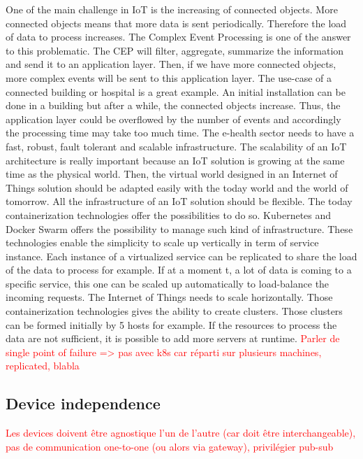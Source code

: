 \documentclass[11pt]{article}
\begin{document}
One of the main challenge in IoT is the increasing of connected objects. More connected objects means that more data is sent periodically. Therefore the load of data to process increases. The Complex Event Processing is one of the answer to this problematic. The CEP will filter, aggregate, summarize the information and send it to an application layer. Then, if we have more connected objects, more complex events will be sent to this application layer. The use-case of a connected building or hospital is a great example. An initial installation can be done in a building but after a while, the connected objects increase. Thus, the application layer could be overflowed by the number of events and accordingly the processing time may take too much time. The e-health sector needs to have a fast, robust, fault tolerant and scalable infrastructure. The scalability of an IoT architecture is really important because an IoT solution is growing at the same time as the physical world. Then, the virtual world designed in an Internet of Things solution should be adapted easily with the today world and the world of tomorrow. 
\newline
\newline
All the infrastructure of an IoT solution should be flexible. The today containerization technologies offer the possibilities to do so. Kubernetes and Docker Swarm offers the possibility to manage such kind of infrastructure. These technologies enable the simplicity to scale up vertically in term of service instance. Each instance of a virtualized service can be replicated to share the load of the data to process for example. If at a moment t, a lot of data is coming to a specific service, this one can be scaled up automatically to load-balance the incoming requests. The Internet of Things needs to scale horizontally. Those containerization technologies gives the ability to create clusters. Those clusters can be formed initially by 5 hosts for example. If the resources to process the data are not sufficient, it is possible to add more servers at runtime. 
\newline
\newline
\textcolor{red}{Parler de single point of failure => pas avec k8s car réparti sur plusieurs machines, replicated, blabla}

\subsection{Device independence}

\textcolor{red}{Les devices doivent être agnostique l'un de l'autre (car doit être interchangeable), pas de communication one-to-one (ou alors via gateway), privilégier pub-sub}
\end{document}
